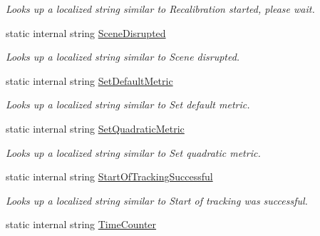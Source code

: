 \begin{DoxyCompactItemize}
\begin{DoxyCompactList}\small\item\em Looks up a localized string similar to Recalibration started, please wait. \end{DoxyCompactList}\item 
static internal string \mbox{\hyperlink{class_chess_tracking_1_1_localization_1_1_program_localization_a24368f4910d4f367d0ae3cfed0180b77}{Scene\+Disrupted}}
\begin{DoxyCompactList}\small\item\em Looks up a localized string similar to Scene disrupted. \end{DoxyCompactList}\item 
static internal string \mbox{\hyperlink{class_chess_tracking_1_1_localization_1_1_program_localization_a24dfccb2ae5a8cc23097b347bee32076}{Set\+Default\+Metric}}
\begin{DoxyCompactList}\small\item\em Looks up a localized string similar to Set default metric. \end{DoxyCompactList}\item 
static internal string \mbox{\hyperlink{class_chess_tracking_1_1_localization_1_1_program_localization_af3f8372059f330adfe60d71cdf26f599}{Set\+Quadratic\+Metric}}
\begin{DoxyCompactList}\small\item\em Looks up a localized string similar to Set quadratic metric. \end{DoxyCompactList}\item 
static internal string \mbox{\hyperlink{class_chess_tracking_1_1_localization_1_1_program_localization_ace8f43e74525d99c96cc544bbf02f4d9}{Start\+Of\+Tracking\+Successful}}
\begin{DoxyCompactList}\small\item\em Looks up a localized string similar to Start of tracking was successful. \end{DoxyCompactList}\item 
static internal string \mbox{\hyperlink{class_chess_tracking_1_1_localization_1_1_program_localization_ac2f2e64575c1bcfdad78f0aa532e7ce5}{Time\+Counter}}

\end{DoxyCompactItemize}
